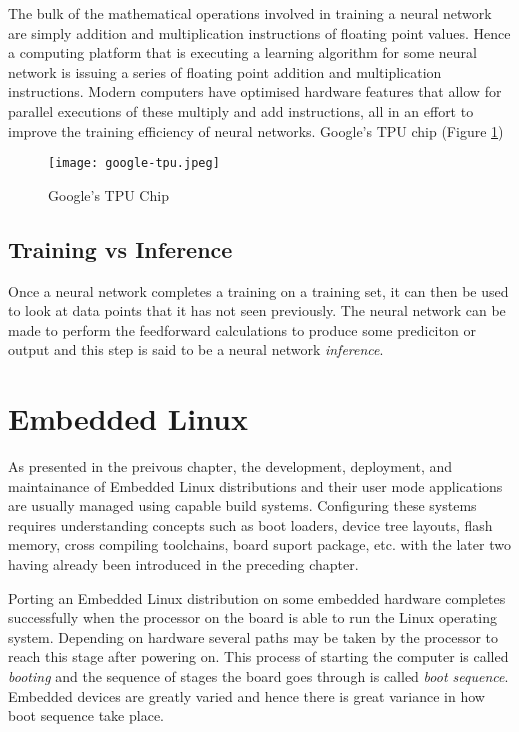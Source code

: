 
The bulk of the mathematical operations involved in training a neural network are simply addition and multiplication instructions of floating point values. Hence a computing platform that is executing a learning algorithm for some neural network is issuing a series of floating point addition and multiplication instructions. Modern computers have optimised hardware features that allow for parallel executions of these multiply and add instructions, all in an effort to improve the training efficiency of neural networks. Google's TPU chip (Figure \ref{fig:google-tpu})

\begin{figure}[h]
	\centering
	\texttt{[image: google-tpu.jpeg]}
	\caption{Google's TPU Chip}
	\label{fig:google-tpu}
\end{figure}

\subsection{Training vs Inference}

Once a neural network completes a training on a training set, it can then be used to look at data points that it has not seen previously. The neural network can be made to perform the feedforward calculations to produce some prediciton or output and this step is said to be a neural network \textit{inference}.

\section{Embedded Linux}

As presented in the preivous chapter, the development, deployment, and maintainance of Embedded Linux distributions and their user mode applications are usually managed using capable build systems. Configuring these systems requires understanding concepts such as boot loaders, device tree layouts, flash memory, cross compiling toolchains, board suport package, etc. with the later two having already been introduced in the preceding chapter.

Porting an Embedded Linux distribution on some embedded hardware completes successfully when the processor on the board is able to run the Linux operating system. Depending on hardware several paths may be taken by the processor to reach this stage after powering on. This process of starting the computer is called \textit{booting} and the sequence of stages the board goes through is called \textit{boot sequence}. Embedded devices are greatly varied and hence there is great variance in how boot sequence take place.

